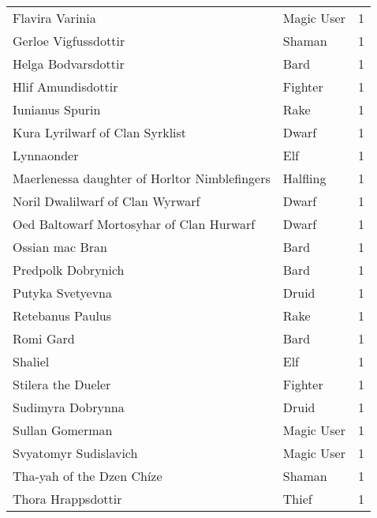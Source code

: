 \begin{tcolorbox}[breakable, title=Index by level]
\begin{supertabular}{p{0.6\columnwidth}lr}
Flavira Varinia                                    & Magic User      &     1\\
Gerloe Vigfussdottir                               & Shaman          &     1\\
Helga Bodvarsdottir                                & Bard            &     1\\
Hlif Amundisdottir                                 & Fighter         &     1\\
Iunianus Spurin                                    & Rake            &     1\\
Kura Lyrilwarf of Clan Syrklist                    & Dwarf           &     1\\
Lynnaonder                                         & Elf             &     1\\
Maerlenessa daughter of Horltor Nimblefingers      & Halfling        &     1\\
Noril Dwalilwarf of Clan Wyrwarf                   & Dwarf           &     1\\
Oed Baltowarf Mortosyhar of Clan Hurwarf           & Dwarf           &     1\\
Ossian mac Bran                                    & Bard            &     1\\
Predpolk Dobrynich                                 & Bard            &     1\\
Putyka Svetyevna                                   & Druid           &     1\\
Retebanus Paulus                                   & Rake            &     1\\
Romi Gard                                          & Bard            &     1\\
Shaliel                                            & Elf             &     1\\
Stilera the Dueler                                 & Fighter         &     1\\
Sudimyra Dobrynna                                  & Druid           &     1\\
Sullan Gomerman                                    & Magic User      &     1\\
Svyatomyr Sudislavich                              & Magic User      &     1\\
Tha-yah of the Dzen Ch\'ize                        & Shaman          &     1\\
Thora Hrappsdottir                                 & Thief           &     1\\

\end{supertabular}
\end{tcolorbox}

